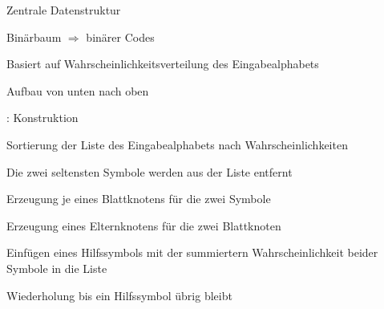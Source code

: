 \documentclass[xcolor=dvipsnames,presentation]{beamer}    %
\newenvironment{witemize}{\itemize\setlength{\itemsep}{1em}}{\enditemize}
\begin{document}
\begin{frame}{\insertsubsection}
  \begin{witemize}
  \item Zentrale Datenstruktur
  \item Binärbaum $\Rightarrow$ binärer Codes
  \item Basiert auf Wahrscheinlichkeitsverteilung des Eingabealphabets
  \item Aufbau von unten nach oben
  \end{witemize}
\end{frame}

\begin{frame}{\insertsubsection: Konstruktion}
  \begin{witemize}
  \item Sortierung der Liste des Eingabealphabets nach Wahrscheinlichkeiten
  \item Die zwei seltensten Symbole werden aus der Liste entfernt
  \item Erzeugung je eines Blattknotens für die zwei Symbole
  \item Erzeugung eines Elternknotens für die zwei Blattknoten
  \item Einfügen eines Hilfssymbols mit der summiertern
    Wahrscheinlichkeit beider Symbole in die Liste
  \item Wiederholung bis ein Hilfssymbol übrig bleibt
  \end{witemize}
\end{frame}
\end{document}
